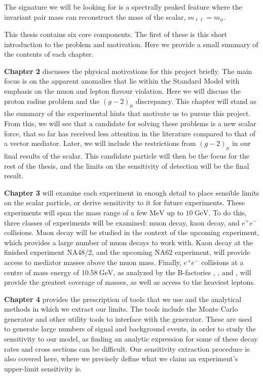 \noindent The signature we will be looking for is a spectrally peaked feature where the invariant pair mass can reconstruct the mass of the scalar, $m_{\ell\ell} = m_\phi$.

This thesis contains six core components.
The first of these is this short introduction to the problem and motivation.
Here we provide a small summary of the contents of each chapter.

\textbf{Chapter 2} discusses the physical motivations for this project briefly.
The main focus is on the apparent anomalies that lie within the Standard Model with emphasis on the muon and lepton flavour violation.
Here we will discuss the proton radius problem and the $(g-2)_\mu$ discrepancy.
This chapter will stand as the summary of the experimental hints that motivate us to pursue this project.
From this, we will see that a candidate for solving these problems is a new scalar force, that so far has received less attention in the literature compared to that of a vector mediator.
Later, we will include the restrictions from $(g-2)_\mu$ in our final results of the scalar.
This candidate particle will then be the focus for the rest of the thesis, and the limits on the sensitivity of detection will be the final result.

\textbf{Chapter 3} will examine each experiment in enough detail to place sensible limits on the scalar particle, or derive sensitivity to it for future experiments.
These experiments will span the mass range of a few $\textrm{MeV}$ up to $10~\textrm{GeV}$.
To do this, three classes of experiments will be examined: muon decay, kaon decay, and $e^+ e^-$ collisions.
Muon decay will be studied in the context of the upcoming \mueee experiment, which provides a large number of muon decays to work with.
Kaon decay at the finished experiment NA48/2, and the upcoming NA62 experiment, will provide access to mediator masses above the muon mass.
Finally, $e^+ e^-$ collisions at a centre of mass energy of $10.58~\textrm{GeV}$, as analyzed by the B-factories \babar, \belle, and \belletwo, will provide the greatest coverage of masses, as well as access to the heaviest leptons.

\textbf{Chapter 4} provides the prescription of tools that we use and the analytical methods in which we extract our limits.
The tools include the Monte Carlo generator \madgraph and other utility tools to interface with the generator.
These are used to generate large numbers of signal and background events, in order to study the sensitivity to our model, as finding an analytic expression for some of these decay rates and cross sections can be difficult.
Our sensitivity extraction procedure is also covered here, where we precisely define what we claim an experiment's upper-limit sensitivity is.

